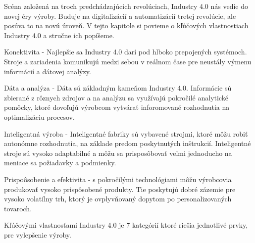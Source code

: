 Scéna založená na troch predchádzajúcich revolúciach, Industry 4.0 nás vedie do novej éry výroby. Buduje na digitalizácií a automatizácií tretej revolúcie, ale posúva to na novú úroveň. V tejto kapitole si povieme o kľúčových vlastnostiach Industry 4.0 a stručne ich popíšeme.

Konektivita - Najlepšie sa Industry 4.0 darí pod hlboko prepojených systémoch. Stroje a zariadenia komunikujú medzi sebou v reálnom čase pre neustály výmenu informácií a dátovej analýzy.

Dáta a analýza - Dáta sú základným kameňom Industry 4.0. Informácie sú zbierané z rôznych zdrojov a na analýzu sa využívajú pokročilé analytické pomôcky, ktoré dovoľujú výrobcom vytvárať inforomované rozhodnutia na optimalizáciu procesov.

Inteligentná výroba - Inteligentné fabriky sú vybavené strojmi, ktoré môžu robiť autonómne rozhodnutia, na základe predom poskytnutých inštrukcií. Inteligentné stroje sú vysoko adaptabilné a môžu sa prisposôbovať veľmi jednoducho na meniace sa požiadavky a podmienky.

Prispoôsobenie a efektivita - s pokročilými technológiami môžu výrobcovia produkovať vysoko prispôsobené produkty. Tie poskytujú dobré zázemie pre vysoko volatílny trh, ktorý je ovplyvňovaný dopytom po personalizovaných tovaroch.

Kľúčovými vlastnosťami Industry 4.0 je 7 kategórií ktoré riešia jednotlivé prvky, pre vylepšenie výroby. 

